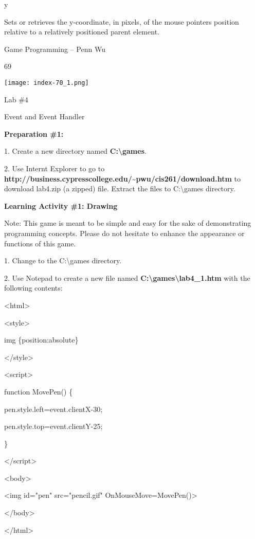 \documentclass[
]{article}
\begin{document}
y

Sets or retrieves the y-coordinate, in pixels, of the mouse
pointer\textquotesingle s position relative to a relatively positioned
parent element.

Game Programming -- Penn Wu

69

\protect\hypertarget{index_split_005.htmlux5cux23p70}{}{}\texttt{[image: index-70\_1.png]}

Lab \#4

Event and Event Handler

\textbf{Preparation \#1:}

1. Create a new directory named \textbf{C:\textbackslash games}.

2. Use Internt Explorer to go to
\textbf{http://business.cypresscollege.edu/\textasciitilde pwu/cis261/download.htm}
to download lab4.zip (a zipped) file. Extract the files to
C:\textbackslash games directory.

\textbf{Learning Activity \#1: Drawing}

Note: This game is meant to be simple and easy for the sake of
demonstrating programming concepts. Please do not hesitate to enhance
the appearance or functions of this game.

\textbf{}

1. Change to the C:\textbackslash games directory.

2. Use Notepad to create a new file named
\textbf{C:\textbackslash games\textbackslash lab4\_1.htm} with the
following contents:

\textless html\textgreater{}

\textless style\textgreater{}

img \{position:absolute\}

\textless/style\textgreater{}

\textless script\textgreater{}

function MovePen() \{

pen.style.left=event.clientX-30;

pen.style.top=event.clientY-25;

\}

\textless/script\textgreater{}

\textless body\textgreater{}

\textless img id="pen" src="pencil.gif"
OnMouseMove=MovePen()\textgreater{}

\textless/body\textgreater{}

\textless/html\textgreater{}
\end{document}
